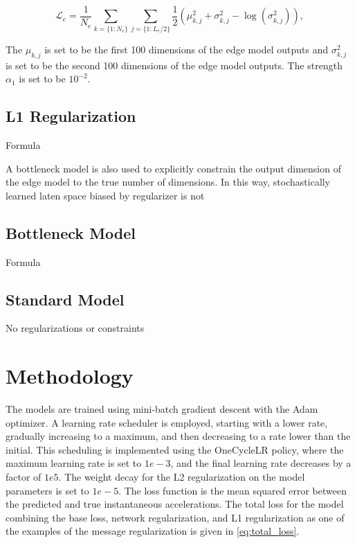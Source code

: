 \documentclass{article}
\begin{document}
\begin{equation}
\mathcal{L}_e = \frac{1}{N_e} \sum_{k=\{1:N_e\}} \sum_{j=\{1:L_e/2\}} \frac{1}{2} \left( \mu_{k,j}^2 + \sigma_{k,j}^2 - \log \left( \sigma_{k,j}^2 \right) \right),
\end{equation}


The \( \mu_{k,j} \) is set to be the first 100 dimensions of the edge model outputs and \( \sigma_{k,j}^2 \) is set to be the second 100 dimensions of the edge model outputs. The strength \(\alpha_1\) is set to be $10^{-2}$.


\subsection{L1 Regularization}
Formula


A bottleneck model is also used to explicitly constrain the output dimension of the edge model to the true number of dimensions. In this way, stochastically learned laten space biased by regularizer is not  

\subsection{Bottleneck Model}
Formula

\subsection{Standard Model}
No regularizations or constraints



\section{Methodology} 

The models are trained using mini-batch gradient descent with the Adam optimizer. A learning rate scheduler is employed, starting with a lower rate, gradually increasing to a maximum, and then decreasing to a rate lower than the initial. This scheduling is implemented using the OneCycleLR policy, where the maximum learning rate is set to $1e-3$, and the final learning rate decreases by a factor of $1e5$. The weight decay for the L2 regularization on the model parameters is set to $1e-5$. The loss function is the mean squared error between the predicted and true instantaneous accelerations. The total loss for the model combining the base loss, network regularization, and L1 regularization as one of the examples of the message regularization is given in \ref{eq:total_loss}.
\end{document}
